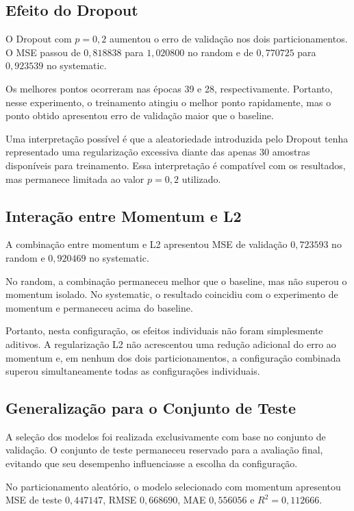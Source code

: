 \documentclass[11pt,a4paper]{article}
\begin{document}
\subsection{Efeito do Dropout}

O Dropout com $p=0,2$ aumentou o erro de validação nos dois
particionamentos. O MSE passou de $0,818838$ para $1,020800$ no random
e de $0,770725$ para $0,923539$ no systematic.

Os melhores pontos ocorreram nas épocas 39 e 28, respectivamente.
Portanto, nesse experimento, o treinamento atingiu o melhor ponto
rapidamente, mas o ponto obtido apresentou erro de validação maior que
o baseline.

Uma interpretação possível é que a aleatoriedade introduzida pelo
Dropout tenha representado uma regularização excessiva diante das
apenas 30 amostras disponíveis para treinamento. Essa interpretação é
compatível com os resultados, mas permanece limitada ao valor
$p=0,2$ utilizado.


\subsection{Interação entre Momentum e L2}

A combinação entre momentum e L2 apresentou MSE de validação $0,723593$
no random e $0,920469$ no systematic.

No random, a combinação permaneceu melhor que o baseline, mas não
superou o momentum isolado. No systematic, o resultado coincidiu com
o experimento de momentum e permaneceu acima do baseline.

Portanto, nesta configuração, os efeitos individuais não foram
simplesmente aditivos. A regularização L2 não acrescentou uma redução
adicional do erro ao momentum e, em nenhum dos dois particionamentos,
a configuração combinada superou simultaneamente todas as configurações
individuais.


\subsection{Generalização para o Conjunto de Teste}

A seleção dos modelos foi realizada exclusivamente com base no conjunto
de validação. O conjunto de teste permaneceu reservado para a avaliação
final, evitando que seu desempenho influenciasse a escolha da
configuração.

No particionamento aleatório, o modelo selecionado com momentum
apresentou MSE de teste $0,447147$, RMSE $0,668690$, MAE $0,556056$ e
$R^2=0,112666$.
\end{document}
